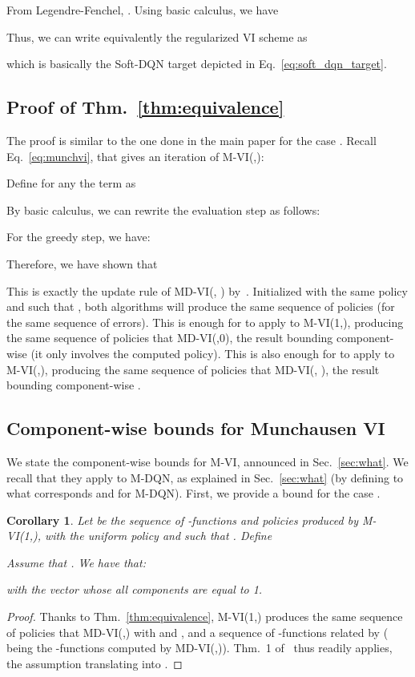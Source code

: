 \documentclass{article}
\newtheorem{cor}{Corollary}
\begin{document}
From Legendre-Fenchel, . Using basic calculus, we have

Thus, we can write equivalently the regularized VI scheme as

which is basically the Soft-DQN target depicted in Eq.~\eqref{eq:soft_dqn_target}.

\subsection{Proof of Thm.~\ref{thm:equivalence}}
\label{subappx:proof_equivalence}

The proof is similar to the one done in the main paper for the case . Recall Eq.~\eqref{eq:munchvi}, that gives an iteration of M-VI(,):

Define for any  the term  as

By basic calculus, we can rewrite the evaluation step as follows:

For the greedy step, we have:

Therefore, we have shown that

This is exactly the update rule of  MD-VI(, ) by~\citet{vieillard2020leverage}. Initialized with the same policy  and such that , both algorithms will produce the same sequence of policies (for the same sequence of errors). This is enough for \cite[Thm.~1]{vieillard2020leverage} to apply to M-VI(1,), producing the same sequence of policies that MD-VI(,0), the result bounding component-wise  (it only involves the computed policy). This is also enough for \cite[Thm.~2]{vieillard2020leverage} to apply to M-VI(,), producing the same sequence of policies that MD-VI(, ), the result bounding component-wise .


\subsection{Component-wise bounds for Munchausen VI}
\label{subappx:bounds}

We state the component-wise bounds for M-VI, announced in Sec.~\ref{sec:what}. We recall that they apply to M-DQN, as explained in Sec.~\ref{sec:what} (by defining to what corresponds  and  for M-DQN). 
First, we provide a bound for the case .

\begin{cor}
\label{cor:alpha_equal_one}
    Let  be the sequence of -functions and policies produced by M-VI(1,), with  the uniform policy and  such that . Define
    
    Assume that . We have that:
    
    with  the vector whose all components are equal to 1.
\end{cor}
\begin{proof}
    Thanks to Thm.~\ref{thm:equivalence}, M-VI(1,) produces the same sequence of policies that MD-VI(,) with  and , and a sequence of -functions related by  ( being the -functions computed by MD-VI(,)). Thm.~1 of~\citet{vieillard2020leverage} thus readily applies, the assumption  translating into .
\end{proof}
\end{document}
